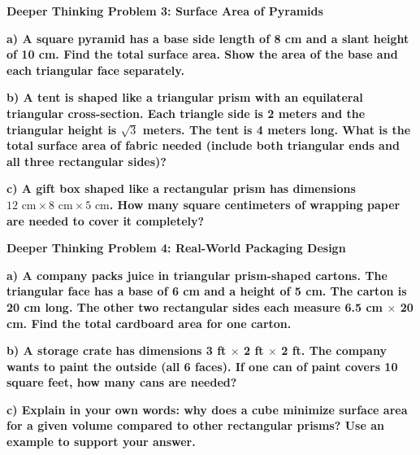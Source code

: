 \documentclass[12pt, letterpaper, fleqn]{article}
\begin{document}
\begin{tcolorbox}[colback=black!5, colframe=black!50, boxrule=1pt, arc=4mm, left=6mm, right=6mm, top=5mm, bottom=5mm]
\textbf{Deeper Thinking Problem 3: Surface Area of Pyramids}

\medskip

\noindent
\textbf{a) A square pyramid has a base side length of 8 cm and a slant height of 10 cm. Find the total surface area. Show the area of the base and each triangular face separately.}

\vspace{2.5cm}

\noindent
\textbf{b) A tent is shaped like a triangular prism with an equilateral triangular cross-section. Each triangle side is 2 meters and the triangular height is $\sqrt{3}$ meters. The tent is 4 meters long. What is the total surface area of fabric needed (include both triangular ends and all three rectangular sides)?}

\vspace{2.5cm}

\noindent
\textbf{c) A gift box shaped like a rectangular prism has dimensions $12\text{ cm} \times 8\text{ cm} \times 5\text{ cm}$. How many square centimeters of wrapping paper are needed to cover it completely?}

\vspace{2cm}
\end{tcolorbox}
\newpage

\begin{tcolorbox}[colback=black!5, colframe=black!50, boxrule=1pt, arc=4mm, left=6mm, right=6mm, top=5mm, bottom=5mm]
\textbf{Deeper Thinking Problem 4: Real-World Packaging Design}

\medskip

\noindent
\textbf{a) A company packs juice in triangular prism-shaped cartons. The triangular face has a base of 6 cm and a height of 5 cm. The carton is 20 cm long. The other two rectangular sides each measure 6.5 cm $\times$ 20 cm. Find the total cardboard area for one carton.}

\vspace{2.5cm}

\noindent
\textbf{b) A storage crate has dimensions 3 ft $\times$ 2 ft $\times$ 2 ft. The company wants to paint the outside (all 6 faces). If one can of paint covers 10 square feet, how many cans are needed?}

\vspace{2.5cm}

\noindent
\textbf{c) Explain in your own words: why does a cube minimize surface area for a given volume compared to other rectangular prisms? Use an example to support your answer.}

\vspace{2.5cm}
\end{tcolorbox}
\end{document}
